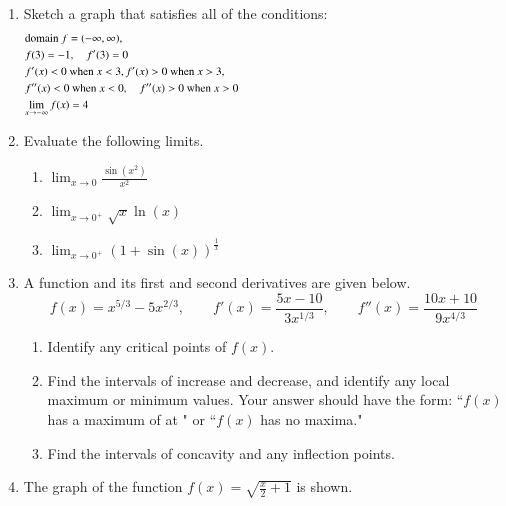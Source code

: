 \documentclass[12pt]{article}
\begin{document}
\begin{enumerate}
\item Sketch a graph that satisfies all of the conditions:
\begin{align*}
  &\text{domain } f = (-\infty,\infty), \hspace{5.0in}\\
  &f(3)=-1, \quad f'(3)=0  \\
  & f'(x)<0 \text{ when } x<3,f'(x)>0 \text{ when } x > 3,  \\
  &f''(x)<0 \text{ when } x<0, \quad f''(x)>0 \text{ when } x>0 \\
  &\displaystyle{\lim_{x \to -\infty} f(x)=4}\\
\end{align*}
\newpage
\item Evaluate the following limits.
\begin{enumerate}
\item $\lim_{x \to 0} \frac{\sin(x^2)}{x^2}$
\vfill
\item $\lim_{x \to 0^+} \sqrt{x} \ln(x)$
\vfill
\item $\lim_{x \to 0^+} \left(1+\sin(x) \right)^{\frac{1}{x}}$
\vfill
\end{enumerate}
\newpage

\item A function and its first and second derivatives are given below.
$$f(x)=x^{5/3}-5x^{2/3}, \quad \quad f'(x)=\frac{5x-10}{3x^{1/3}}, \quad \quad f''(x)=\frac{10x+10}{9x^{4/3}}$$
\begin{enumerate}
\item Identify any critical points of $f(x).$
\vfill
\item Find the intervals of increase and decrease, and identify any local maximum or minimum values. Your answer should have the form: ``$f(x)$ has a maximum of \underline{\hspace{.3in}}  at \underline{\hspace{.3in}}" or ``$f(x)$ has no maxima."
\vfill
\item Find the intervals of concavity and any inflection points.
\vfill
\end{enumerate}
\newpage
\item The graph of the function $\displaystyle f(x) = \sqrt{\frac{x}{2}+1}$ is shown.



\end{enumerate}
\end{document}
